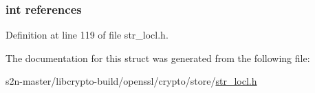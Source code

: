 \subsubsection[{\texorpdfstring{references}{references}}]{\setlength{\rightskip}{0pt plus 5cm}int references}\hypertarget{structstore__st_a146fdb34d9a909e530adf8b189481195}{}\label{structstore__st_a146fdb34d9a909e530adf8b189481195}


Definition at line 119 of file str\+\_\+locl.\+h.



The documentation for this struct was generated from the following file\+:\begin{DoxyCompactItemize}
\item 
s2n-\/master/libcrypto-\/build/openssl/crypto/store/\hyperlink{str__locl_8h}{str\+\_\+locl.\+h}\end{DoxyCompactItemize}
